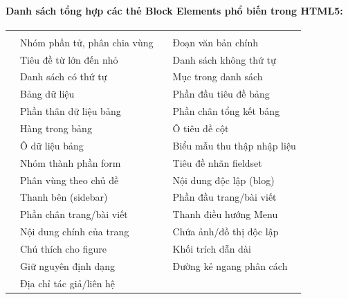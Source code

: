 \paragraph{Danh sách tổng hợp các thẻ Block Elements phổ biến trong HTML5:}
\begin{prettyTableBox}
\begin{tabularx}{\linewidth}{K{2.0cm} Z K{2.0cm} Z}
 &  &  &  \\
 & Nhóm phần tử, phân chia vùng &  & Đoạn văn bản chính \\
 & Tiêu đề từ lớn đến nhỏ &  & Danh sách không thứ tự \\
 & Danh sách có thứ tự &  & Mục trong danh sách \\
 & Bảng dữ liệu &  & Phần đầu tiêu đề bảng \\
 & Phần thân dữ liệu bảng &  & Phần chân tổng kết bảng \\
 & Hàng trong bảng &  & Ô tiêu đề cột \\
 & Ô dữ liệu bảng &  & Biểu mẫu thu thập nhập liệu \\
 & Nhóm thành phần form &  & Tiêu đề nhãn fieldset \\
 & Phân vùng theo chủ đề &  & Nội dung độc lập (blog) \\
 & Thanh bên (sidebar) &  & Phần đầu trang/bài viết \\
 & Phần chân trang/bài viết &  & Thanh điều hướng Menu \\
 & Nội dung chính của trang &  & Chứa ảnh/đồ thị độc lập \\
 & Chú thích cho figure &  & Khối trích dẫn dài \\
 & Giữ nguyên định dạng &  & Đường kẻ ngang phân cách \\
 & Địa chỉ tác giả/liên hệ & & \\
\end{tabularx}
\end{prettyTableBox}

